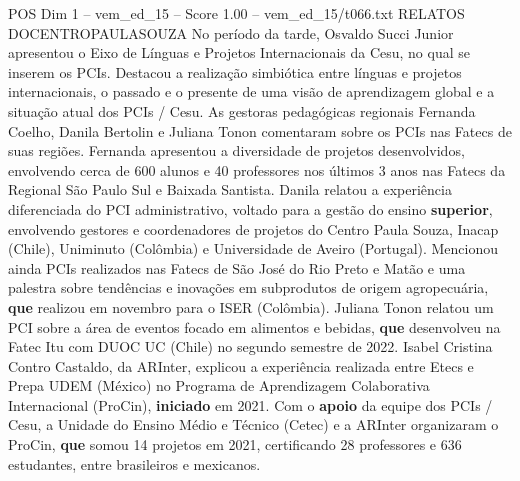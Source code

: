 \begin{textsample}{POS Dim 1 – vem\_ed\_15 – Score 1.00 – vem\_ed\_15/t066.txt}  \label{ex:f1_pos_101}
RELATOS DOCENTROPAULASOUZA No período da tarde, Osvaldo Succi Junior apresentou o Eixo de Línguas e Projetos Internacionais da Cesu, no qual se inserem os PCIs.
Destacou a realização simbiótica entre línguas e projetos internacionais, o passado e o presente de uma visão de aprendizagem global e a situação atual dos PCIs / Cesu.
As gestoras pedagógicas regionais Fernanda Coelho, Danila Bertolin e Juliana Tonon comentaram sobre os PCIs nas Fatecs de suas regiões.
Fernanda apresentou a diversidade de projetos desenvolvidos, envolvendo cerca de 600 alunos e 40 professores nos últimos 3 anos nas Fatecs da Regional São Paulo Sul e Baixada Santista.
Danila relatou a experiência diferenciada do PCI administrativo, voltado para a gestão do ensino \textbf{superior}, envolvendo gestores e coordenadores de projetos do Centro Paula Souza, Inacap (Chile), Uniminuto (Colômbia) e Universidade de Aveiro (Portugal).
Mencionou ainda PCIs realizados nas Fatecs de São José do Rio Preto e Matão e uma palestra sobre tendências e inovações em subprodutos de origem agropecuária, \textbf{que} realizou em novembro para o ISER (Colômbia).
Juliana Tonon relatou um PCI sobre a área de eventos focado em alimentos e bebidas, \textbf{que} desenvolveu na Fatec Itu com DUOC UC (Chile) no segundo semestre de 2022.
Isabel Cristina Contro Castaldo, da ARInter, explicou a experiência realizada entre Etecs e Prepa UDEM (México) no Programa de Aprendizagem Colaborativa Internacional (ProCin), \textbf{iniciado} em 2021.
Com o \textbf{apoio} da equipe dos PCIs / Cesu, a Unidade do Ensino Médio e Técnico (Cetec) e a ARInter organizaram o ProCin, \textbf{que} somou 14 projetos em 2021, certificando 28 professores e 636 estudantes, entre brasileiros e mexicanos.

\end{textsample}
